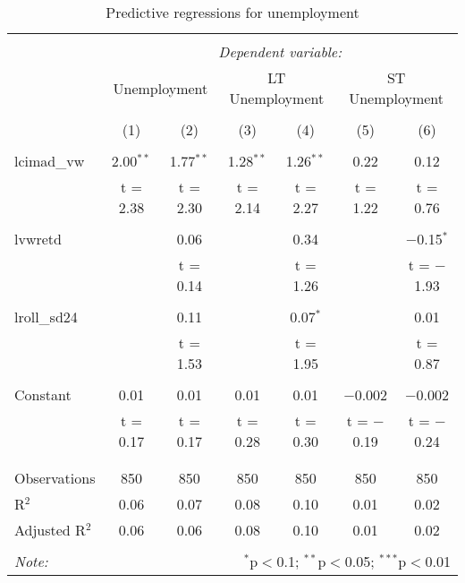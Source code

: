 \documentclass[12pt]{article}
\begin{document}
\begin{table}[!htbp] \centering 
  \caption{Predictive regressions for unemployment} 
  \label{} 
\begin{tabular}{@{\extracolsep{0pt}}lcccccc} 
\\[-1.8ex]\hline 
\hline \\[-1.8ex] 
 & \multicolumn{6}{c}{\textit{Dependent variable:}} \\ 
\cline{2-7} 
 & \multicolumn{2}{c}{Unemployment} & \multicolumn{2}{c}{LT Unemployment} & \multicolumn{2}{c}{ST Unemployment} \\ 
\\[-1.8ex] & (1) & (2) & (3) & (4) & (5) & (6)\\ 
\hline \\[-1.8ex] 
 lcimad\_vw & 2.00$^{**}$ & 1.77$^{**}$ & 1.28$^{**}$ & 1.26$^{**}$ & 0.22 & 0.12 \\ 
  & t = 2.38 & t = 2.30 & t = 2.14 & t = 2.27 & t = 1.22 & t = 0.76 \\ 
  & & & & & & \\ 
 lvwretd &  & 0.06 &  & 0.34 &  & $-$0.15$^{*}$ \\ 
  &  & t = 0.14 &  & t = 1.26 &  & t = $-$1.93 \\ 
  & & & & & & \\ 
 lroll\_sd24 &  & 0.11 &  & 0.07$^{*}$ &  & 0.01 \\ 
  &  & t = 1.53 &  & t = 1.95 &  & t = 0.87 \\ 
  & & & & & & \\ 
 Constant & 0.01 & 0.01 & 0.01 & 0.01 & $-$0.002 & $-$0.002 \\ 
  & t = 0.17 & t = 0.17 & t = 0.28 & t = 0.30 & t = $-$0.19 & t = $-$0.24 \\ 
  & & & & & & \\ 
\hline \\[-1.8ex] 
Observations & 850 & 850 & 850 & 850 & 850 & 850 \\ 
R$^{2}$ & 0.06 & 0.07 & 0.08 & 0.10 & 0.01 & 0.02 \\ 
Adjusted R$^{2}$ & 0.06 & 0.06 & 0.08 & 0.10 & 0.01 & 0.02 \\ 

\hline 
\hline \\[-1.8ex] 
\textit{Note:}  & \multicolumn{6}{r}{$^{*}$p$<$0.1; $^{**}$p$<$0.05; $^{***}$p$<$0.01} \\ 
\end{tabular} 
\end{table}
\end{document}
